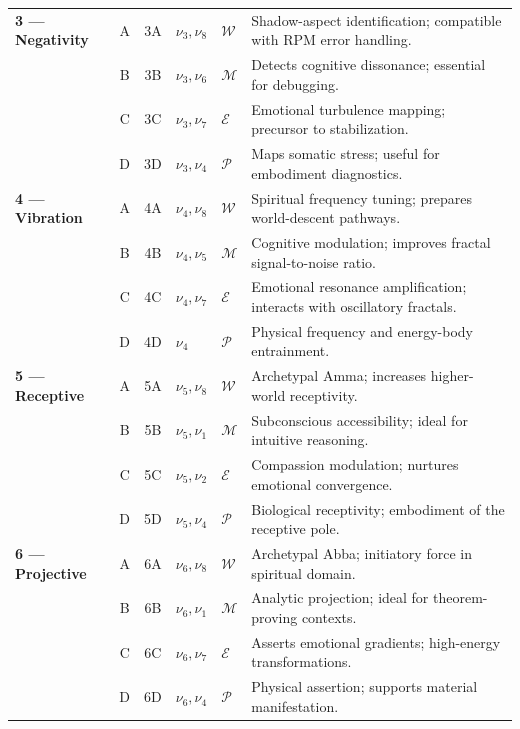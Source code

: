 \begin{longtable}{p{1.8cm}|c|c|p{1.5cm}|p{1.5cm}|p{4.5cm}}
\textbf{3 --- Negativity}
& A & 3A &
$\nu_3, \nu_8$ &
$\mathcal{W}$ &
Shadow-aspect identification; compatible with RPM error handling.
\\
& B & 3B &
$\nu_3, \nu_6$ &
$\mathcal{M}$ &
Detects cognitive dissonance; essential for debugging.
\\
& C & 3C &
$\nu_3, \nu_7$ &
$\mathcal{E}$ &
Emotional turbulence mapping; precursor to stabilization.
\\
& D & 3D &
$\nu_3, \nu_4$ &
$\mathcal{P}$ &
Maps somatic stress; useful for embodiment diagnostics.
\\
\midrule

\textbf{4 --- Vibration}
& A & 4A &
$\nu_4, \nu_8$ &
$\mathcal{W}$ &
Spiritual frequency tuning; prepares world-descent pathways.
\\
& B & 4B &
$\nu_4, \nu_5$ &
$\mathcal{M}$ &
Cognitive modulation; improves fractal signal-to-noise ratio.
\\
& C & 4C &
$\nu_4, \nu_7$ &
$\mathcal{E}$ &
Emotional resonance amplification; interacts with oscillatory fractals.
\\
& D & 4D &
$\nu_4$ &
$\mathcal{P}$ &
Physical frequency and energy-body entrainment.
\\
\midrule

\textbf{5 --- Receptive}
& A & 5A &
$\nu_5, \nu_8$ &
$\mathcal{W}$ &
Archetypal Amma; increases higher-world receptivity.
\\
& B & 5B &
$\nu_5, \nu_1$ &
$\mathcal{M}$ &
Subconscious accessibility; ideal for intuitive reasoning.
\\
& C & 5C &
$\nu_5, \nu_2$ &
$\mathcal{E}$ &
Compassion modulation; nurtures emotional convergence.
\\
& D & 5D &
$\nu_5, \nu_4$ &
$\mathcal{P}$ &
Biological receptivity; embodiment of the receptive pole.
\\
\midrule

\textbf{6 --- Projective}
& A & 6A &
$\nu_6, \nu_8$ &
$\mathcal{W}$ &
Archetypal Abba; initiatory force in spiritual domain.
\\
& B & 6B &
$\nu_6, \nu_1$ &
$\mathcal{M}$ &
Analytic projection; ideal for theorem-proving contexts.
\\
& C & 6C &
$\nu_6, \nu_7$ &
$\mathcal{E}$ &
Asserts emotional gradients; high-energy transformations.
\\
& D & 6D &
$\nu_6, \nu_4$ &
$\mathcal{P}$ &
Physical assertion; supports material manifestation.
\\
\midrule


\end{longtable}
